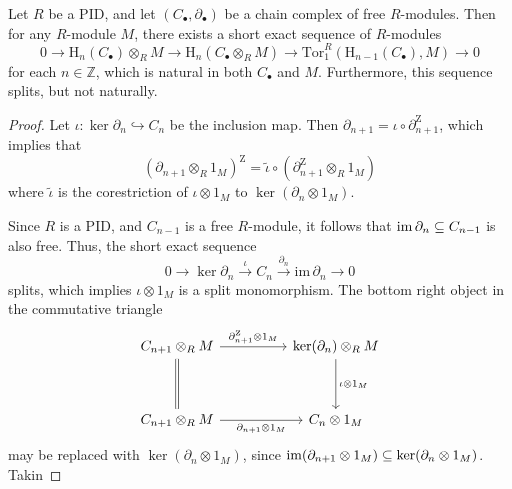 \begin{theorem}
    Let $R$ be a PID, and let $(C_\bullet, \partial_\bullet)$ be a chain complex of free $R$-modules. Then for any $R$-module $M$, there exists a short exact sequence of $R$-modules 
    \begin{equation*}
        0 \to \mathrm{H}_n(C_\bullet) \otimes_R M \to \mathrm{H}_n(C_\bullet \otimes_R M) \to \mathrm{Tor}_1^R(\mathrm{H}_{n-1}(C_\bullet), M) \to 0
    \end{equation*}
    for each $n \in \mathbb{Z}$, which is natural in both $C_\bullet$ and $M$. Furthermore, this sequence splits, but not naturally.
\end{theorem}

\begin{proof}
Let $\iota \colon \ker \partial_n \hookrightarrow C_n$ be the inclusion map. Then $\partial_{n+1} = \iota \circ \partial_{n+1}^{\mathrm{Z}}$, which implies that 
\begin{equation*}
(\partial_{n+1} \otimes_R 1_M)^\mathrm{Z} = \widetilde{\iota} \circ (\partial^{\mathrm{Z}}_{n+1} \otimes_R 1_M)
\end{equation*}
where $\widetilde{\iota}$ is the corestriction of $\iota \otimes 1_M$ to $\ker (\partial_n \otimes 1_M)$.

Since $R$ is a PID, and $C_{n-1}$ is a free $R$-module, it follows that $\operatorname{im} \partial_n \subseteq C_{n-1}$ is also free. Thus, the short exact sequence
\begin{equation*}
    0 \to \ker \partial_n \xrightarrow{\iota} C_n \xrightarrow{\partial_n} \mathrm{im}\, \partial_n \to 0
\end{equation*}
splits, which implies $\iota \otimes 1_M$ is a split monomorphism. The bottom right object in the commutative triangle
\begin{equation*}
  \begin{tikzcd}
    {C_{n+1} \otimes_R M} && {\ker(\partial_n) \otimes_R M} \\
    \\
    {C_{n+1} \otimes_R M} && {C_n\otimes1_M}
    \arrow["{\partial_{n+1}^{\mathrm{Z}} \otimes1_M}", from=1-1, to=1-3]
    \arrow[equals, from=1-1, to=3-1]
    \arrow["{\iota \otimes 1_M}", from=1-3, to=3-3]
    \arrow["{\partial_{n+1}\otimes1_M}"', from=3-1, to=3-3]
  \end{tikzcd}
\end{equation*}
may be replaced with $\ker (\partial_n \otimes 1_M)$, since $\operatorname{im} (\partial_{n+1} \otimes 1_M) \subseteq \ker (\partial_n \otimes 1_M)$. Takin
\end{proof}

